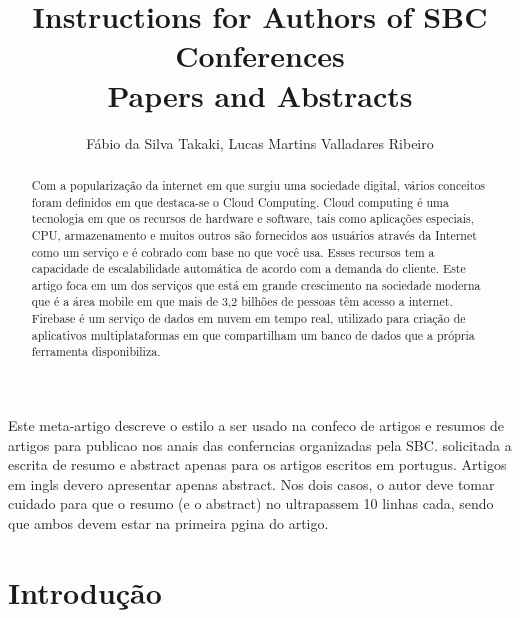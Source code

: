 \documentclass[12pt]{article}
\title{Instructions for Authors of SBC Conferences\\ Papers and Abstracts}
\author{Fábio da Silva Takaki\inst{1}, Lucas Martins Valladares Ribeiro\inst{1} }
\begin{document}
 

\maketitle

\begin{abstract}
    Com a popularização da internet em que surgiu uma sociedade digital, vários conceitos foram definidos em que destaca-se o Cloud Computing. Cloud computing é uma tecnologia em que os recursos de hardware e software, tais como aplicações especiais, CPU, armazenamento e muitos outros são fornecidos aos usuários através da Internet como um serviço e é cobrado com base no que você usa. Esses recursos tem a capacidade de escalabilidade automática de acordo com a demanda do cliente. Este artigo foca em um dos serviços que está em grande crescimento na sociedade moderna que é a área mobile em que mais de 3,2 bilhões de pessoas têm acesso a internet. Firebase é um serviço de dados em nuvem em tempo real, utilizado para criação de aplicativos multiplataformas em que compartilham um banco de dados que a própria ferramenta disponibiliza.
\end{abstract}
     
\begin{resumo} 
  Este meta-artigo descreve o estilo a ser usado na confeco de artigos e
  resumos de artigos para publicao nos anais das conferncias organizadas
  pela SBC.  solicitada a escrita de resumo e abstract apenas para os artigos
  escritos em portugus. Artigos em ingls devero apresentar apenas abstract.
  Nos dois casos, o autor deve tomar cuidado para que o resumo (e o abstract)
  no ultrapassem 10 linhas cada, sendo que ambos devem estar na primeira
  pgina do artigo.
\end{resumo}


\section{Introdução}
\end{document}
